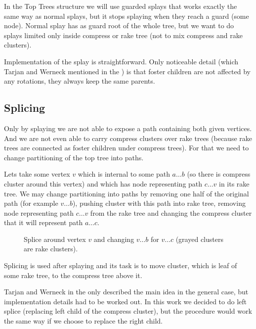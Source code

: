 In the Top Trees structure we will use {\I guarded splays} that works exactly
the same way as normal splays, but it stops splaying when they reach a guard (some
node). Normal splay has as guard root of the whole tree, but we want to do
splays limited only inside compress or rake tree (not to mix compress and
rake clusters).

Implementation of the splay is straightforward. Only noticeable detail (which
Tarjan and Werneck mentioned in the \cite{SelfAdjustingTT}) is that foster
children are not affected by any rotations, they always keep the same parents.

\subsection{Splicing}

Only by splaying we are not able to expose a path containing both given
vertices. And we are not even able to carry compress clusters over rake trees
(because rake trees are connected as foster children under compress trees). For
that we need to change partitioning of the top tree into paths.

Lets take some vertex $v$ which is internal to some path $a\dots b$ (so there is
compress cluster around this vertex) and which has node representing path
$c\dots v$ in its rake tree. We may change partitioning into paths by removing
one half of the original path (for example $v\dots b$), pushing cluster with
this path into rake tree, removing node representing path $c\dots v$ from the
rake tree and changing the compress cluster that it will represent path $a\dots c$.

\begin{figure}[H]
\centering
{}
\caption[Splice around vertex $v$]
{Splice around vertex $v$ and changing $v\dots b$ for $v\dots c$ (grayed clusters are rake
clusters).}
\end{figure}

Splicing is used after splaying and its task is to move cluster, which is leaf
of some rake tree, to the compress tree above it.

Tarjan and Werneck in the \cite{SelfAdjustingTT} only described the main idea in
the general case, but implementation details had to be worked out. In this work
we decided to do {\I left splice} (replacing left child of the compress cluster),
but the procedure would work the same way if we choose to replace the right child.

